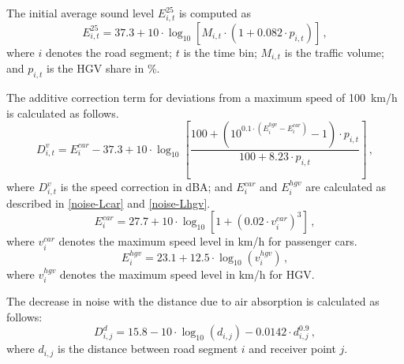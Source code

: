 The initial average sound level $E_{i, t}^{25}$ is computed as
\begin{equation}
\label{noise-Lm25}
E_{i, t}^{25} = 37.3 + 10 \cdot \log_{10} \left[M_{i, t} \cdot \left(1 + 0.082 \cdot p_{i, t}\right)\right] \, ,
\end{equation}
where $i$ denotes the road segment; $t$ is the time bin; $M_{i, t}$ is the traffic volume; and $p_{i, t}$
is the \gls{HGV} share in \%.

The additive correction term for deviations from a maximum speed of 100~\acrshort{km}/\acrshort{h} is calculated as follows.
\begin{equation}
D_{i,t}^{v} = E_{i}^{car} - 37.3 + 10 \cdot \log_{10}\left[\frac{100 + (10^{0.1 \cdot (E_{i}^{hgv} - E_{i}^{car})} - 1) \cdot p_{i,t}} {100 + 8.23 \cdot p_{i,t}}\right] \, ,
\end{equation}
where $D_{i,t}^{v}$ is the speed correction in \acrshort{dBA}; and $E_{i}^{car}$ and $E_{i}^{hgv}$ are calculated as described in \cref{noise-Lcar} and \cref{noise-Lhgv}.
\begin{equation}
\label{noise-Lcar}
E_{i}^{car} = 27.7 + 10 \cdot \log_{10} \left[ 1 + \left( 0.02 \cdot v_{i}^{car} \right)^{3} \right] \, ,
\end{equation}
where $v_{i}^{car}$ denotes the maximum speed level in \acrshort{km}/\acrshort{h} for passenger cars.
\begin{equation}
\label{noise-Lhgv}
E_{i}^{hgv} = 23.1 + 12.5 \cdot \log_{10} \left(v_{i}^{hgv}\right) \, ,
\end{equation}
where $v_{i}^{hgv}$ denotes the maximum speed level in \acrshort{km}/\acrshort{h} for \gls{HGV}.

The decrease in noise with the distance due to air absorption is calculated as follows:
\begin{equation}
\label{noise-Dd}
D_{i, j}^{d} =15.8 - 10 \cdot \log_{10} \left(d_{i,j} \right) - 0.0142 \cdot d_{i,j}^{0.9} \, ,
\end{equation}
where $d_{i,j}$ is the distance between road segment $i$ and receiver point $j$.
